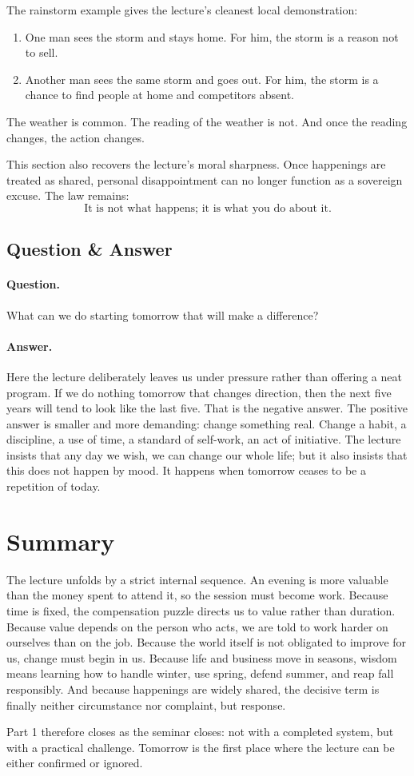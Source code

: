 The rainstorm example gives the lecture's cleanest local demonstration:
\begin{enumerate}
\item One man sees the storm and stays home. For him, the storm is a reason not to sell.
\item Another man sees the same storm and goes out. For him, the storm is a chance to find people at home and competitors absent.
\end{enumerate}
The weather is common. The reading of the weather is not. And once the reading changes, the action changes.

This section also recovers the lecture's moral sharpness. Once happenings are treated as shared, personal disappointment can no longer function as a sovereign excuse. The law remains:
\begin{equation}
\text{It is not what happens; it is what you do about it.}
\end{equation}

\subsection{Question \& Answer}

\paragraph{Question.} What can we do starting tomorrow that will make a difference?

\paragraph{Answer.} Here the lecture deliberately leaves us under pressure rather than offering a neat program. If we do nothing tomorrow that changes direction, then the next five years will tend to look like the last five. That is the negative answer. The positive answer is smaller and more demanding: change something real. Change a habit, a discipline, a use of time, a standard of self-work, an act of initiative. The lecture insists that any day we wish, we can change our whole life; but it also insists that this does not happen by mood. It happens when tomorrow ceases to be a repetition of today.

\section{Summary}

The lecture unfolds by a strict internal sequence. An evening is more valuable than the money spent to attend it, so the session must become work. Because time is fixed, the compensation puzzle directs us to value rather than duration. Because value depends on the person who acts, we are told to work harder on ourselves than on the job. Because the world itself is not obligated to improve for us, change must begin in us. Because life and business move in seasons, wisdom means learning how to handle winter, use spring, defend summer, and reap fall responsibly. And because happenings are widely shared, the decisive term is finally neither circumstance nor complaint, but response.

Part 1 therefore closes as the seminar closes: not with a completed system, but with a practical challenge. Tomorrow is the first place where the lecture can be either confirmed or ignored.